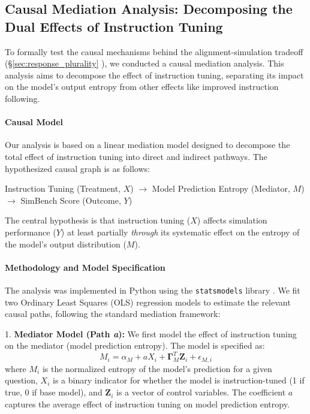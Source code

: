 \documentclass{article} %
\begin{document}
\subsection{Causal Mediation Analysis: Decomposing the Dual Effects of Instruction Tuning}
\label{sec:causal_mediation_analysis}
To formally test the causal mechanisms behind the alignment-simulation tradeoff (\S\ref{sec:response_plurality}
), we conducted a causal mediation analysis. This analysis aims to decompose the effect of instruction tuning, separating its impact on the model's output entropy from other effects like improved instruction following.

\paragraph{Causal Model}
Our analysis is based on a linear mediation model designed to decompose the total effect of instruction tuning into direct and indirect pathways. The hypothesized causal graph is as follows:


\begin{center}
    Instruction Tuning (Treatment, $X$) $\rightarrow$ Model Prediction Entropy (Mediator, $M$) $\rightarrow$ SimBench Score (Outcome, $Y$)
\end{center}

The central hypothesis is that instruction tuning ($X$) affects simulation performance ($Y$) at least partially \textit{through} its systematic effect on the entropy of the model's output distribution ($M$).

\paragraph{Methodology and Model Specification}
The analysis was implemented in Python using the \texttt{statsmodels} library \citep{seabold-proc-scipy-2010}. We fit two Ordinary Least Squares (OLS) regression models to estimate the relevant causal paths, following the standard mediation framework:

1.  \textbf{Mediator Model (Path \textit{a}):} We first model the effect of instruction tuning on the mediator (model prediction entropy). The model is specified as:
    \begin{equation}
    M_i = \alpha_M + a X_i + \mathbf{\Gamma}_M^T \mathbf{Z}_i + \epsilon_{M,i}
    \end{equation}
    where $M_i$ is the normalized entropy of the model's prediction for a given question, $X_i$ is a binary indicator for whether the model is instruction-tuned (1 if true, 0 if base model), and $\mathbf{Z}_i$ is a vector of control variables. The coefficient $a$ captures the average effect of instruction tuning on model prediction entropy.
\end{document}
